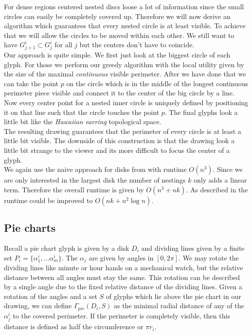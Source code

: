 \documentclass[a4paper,11pt]{article}
\begin{document}
For dense regions centered nested discs loose a lot of information since the small circles can easily be completely covered up. Therefore we will now derive an algorithm which guarantees that every nested circle is at least visible. To achieve that we will allow the circles to be moved within each other. We still want to have $G^i_{j+1}\subset G^i_j$ for all $j$ but the centers don't have to coincide.\\

Our approach is quite simple. We first just look at the biggest circle of each glyph. For those we perform our greedy algorithm with the local utility given by the size of the maximal \textit{continuous} visible perimeter. After we have done that we can take the point $p$ on the circle which is in the middle of the longest continuous perimeter piece visible and connect it to the center of the big circle by a line. Now every center point for a nested inner circle is uniquely defined by positioning it on that line such that the circle touches the point $p$. The final glyphs look a little bit like the \textit{Hawaiian earring} topological space.\\

The resulting drawing guarantees that the perimeter of every circle is at least a little bit visible. The downside of this construction is that the drawing look a little bit strange to the viewer and its more difficult to focus the center of a glyph. \\

We again use the naive approach for disks from \cite{cabello} with runtime $O(n^3)$. Since we are only interested in the largest disk the number of nestings $k$ only adds a linear term. Therefore the overall runtime is given by $O(n^3+nk)$. As described in \cite{cabello} the runtime could be improved to $O(nk+n^2 \log n)$.


\subsection{Pie charts}

Recall a pie chart glyph is given by a disk $D_i$ and dividing lines given by a finite set $P_i= \{\alpha_1^i,...\alpha_m^i\}$. The $\alpha_j$ are given by angles in $[0,2\pi ]$. We may rotate the dividing lines like minute or hour hands on a mechanical watch, but the relative distance between all angles must stay the same. This rotation can be described by a single angle due to the fixed relative distance of the dividing lines. Given a rotation of the angles and a set $S$ of glyphs which lie above the pie chart in our drawing, we can define $\Gamma_{pie}(D_i,S)$ as the minimal radial distance of any of the $\alpha^i_j$ to the covered perimeter. If the perimeter is completely visible, then this distance is defined as half the circumference or $\pi r_i$.\\
\end{document}
